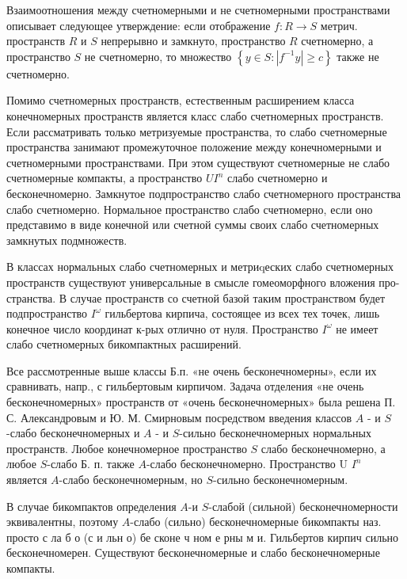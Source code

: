 \documentclass[10pt]{article}
\begin{document}
Взаимоотношения между счетномерными и не счетномерными пространствами описывает следующее утверждение: если отображение $f: R \rightarrow S$ метрич. пространств $R$ и $S$ непрерывно и замкнуто, пространство $R$ счетномерно, а пространство $S$ не счетномерно, то множество $\left\{y \in S:\left|f^{-1} y\right| \geqslant c\right\}$ также не счетномерно.



Помимо счетномерных пространств, естественным расширением класса конечномерных пространств является класс слабо счетномерных пространств. Если рассматривать только метризуемые пространства, то слабо счетномерные пространства занимают промежуточное положение между конечномерными и счетномерными пространствами. При этом существуют счетномерные не слабо счетномерные компакты, а пространство $U I^{n}$ слабо счетномерно и бесконечномерно. Замкнутое подпространство слабо счетномерного пространства слабо счетномерно. Нормальное пространство слабо счетномерно, если оно представимо в виде конечной или счетной суммы своих слабо счетномерных замкнутых подмножеств.



В классах нормальных слабо счетномерных и метриqеских слабо счетномерных пространств существуют универсальные в смысле гомеоморфного вложения про- странства. В случае пространств со счетной базой таким пространством будет подпространство $I^{\omega}$ гильбертова кирпича, состоящее из всех тех точек, лишь конечное число координат к-рых отлично от нуля. Пространство $I^{\omega}$ не имеет слабо счетномерных бикомпактных расширений.



Все рассмотренные выше классы Б.п. «не очень бесконечномерны», если их сравнивать, напр., с гильбертовым кирпичом. Задача отделения «не очень бесконечномерных» пространств от «очень бесконечномерных» была решена П. С. Александровым и Ю. М. Смирновым посредством введения классов $A$ - и $S$-слабо бесконечномерных и $A$ - и $S$-сильно бесконечномерных нормальных пространств. Любое конечномерное пространство $S$ слабо бесконечномерно, а любое $S$-слабо Б. п. также $A$-слабо бесконечномерно. Пространство U $I^{n}$ является $A$-слабо бесконечномерным, но $S$-сильно бесконечномерным.



В случае бикомпактов определения $A$-и $S$-слабой (сильной) бесконечномерности эквивалентны, поэтому $A$-слабо (сильно) бесконечномерные бикомпакты наз. просто с ла б о (с и льн о) бе сконе ч ном е рны м и. Гильбертов кирпич сильно бесконечномерен. Существуют бесконечномерные и слабо бесконечномерные компакты.
\end{document}
